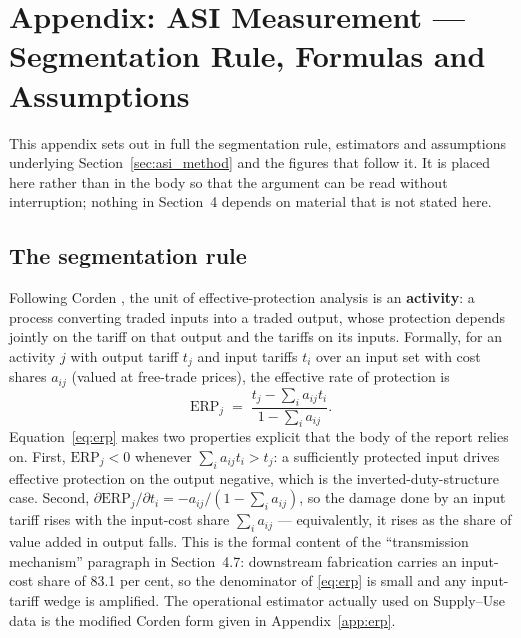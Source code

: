 
\section{Appendix: ASI Measurement --- Segmentation Rule, Formulas and Assumptions}
\label{app:asi}

This appendix sets out in full the segmentation rule, estimators and assumptions
underlying Section~\ref{sec:asi_method} and the figures that follow it. It is
placed here rather than in the body so that the argument can be read without
interruption; nothing in Section~4 depends on material that is not stated here.

\subsection{The segmentation rule}
\label{app:asi_rule}

Following Corden \cite{corden1966}, the unit of effective-protection analysis is an
\textbf{activity}: a process converting traded inputs into a traded output, whose
protection depends jointly on the tariff on that output and the tariffs on its
inputs. Formally, for an activity $j$ with output tariff $t_j$ and input tariffs
$t_i$ over an input set with cost shares $a_{ij}$ (valued at free-trade prices),
the effective rate of protection is
\begin{equation}
    \mathrm{ERP}_j \;=\; \frac{t_j - \sum_i a_{ij} t_i}{1 - \sum_i a_{ij}} .
    \label{eq:erp}
\end{equation}
Equation~\eqref{eq:erp} makes two properties explicit that the body of the report
relies on. First, $\mathrm{ERP}_j < 0$ whenever $\sum_i a_{ij} t_i > t_j$: a
sufficiently protected input drives effective protection on the output negative,
which is the inverted-duty-structure case. Second,
$\partial \mathrm{ERP}_j / \partial t_i = -a_{ij}/(1 - \sum_i a_{ij})$, so the
damage done by an input tariff rises with the input-cost share $\sum_i a_{ij}$ ---
equivalently, it rises as the share of value added in output falls. This is the
formal content of the ``transmission mechanism'' paragraph in Section~4.7:
downstream fabrication carries an input-cost share of 83.1 per cent, so the
denominator of \eqref{eq:erp} is small and any input-tariff wedge is amplified.
The operational estimator actually used on Supply--Use data is the modified
Corden form given in Appendix~\ref{app:erp}.

